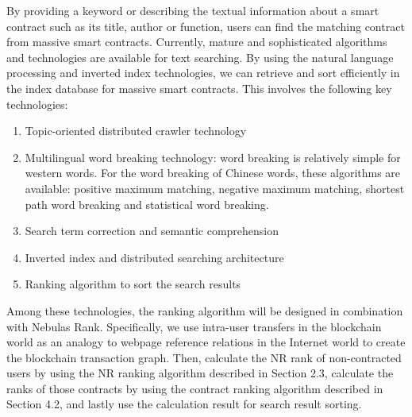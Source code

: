 By providing a keyword or describing the textual information about a smart contract such as its title, author or function, users can find the matching contract from massive smart contracts. Currently, mature and sophisticated algorithms and technologies are available for text searching. By using the natural language processing and inverted index technologies, we can retrieve and sort efficiently in the index database for massive smart contracts. This involves the following key technologies:


\begin{enumerate}
	\item Topic-oriented distributed crawler technology
	\item Multilingual word breaking technology: word breaking is relatively simple for western words. For the word breaking of Chinese words, these algorithms are available: positive maximum matching, negative maximum matching, shortest path word breaking and statistical word breaking.
	\item Search term correction and semantic comprehension
	\item Inverted index and distributed searching architecture
	\item Ranking algorithm to sort the search results

\end{enumerate}

Among these technologies, the ranking algorithm will be designed in combination with Nebulas Rank. Specifically, we use intra-user transfers in the blockchain world as an analogy to webpage reference relations in the Internet world to create the blockchain transaction graph. Then, calculate the NR rank of non-contracted users by using the NR ranking algorithm described in Section 2.3, calculate the ranks of those contracts by using the contract ranking algorithm described in Section 4.2, and lastly use the calculation result for search result sorting.

